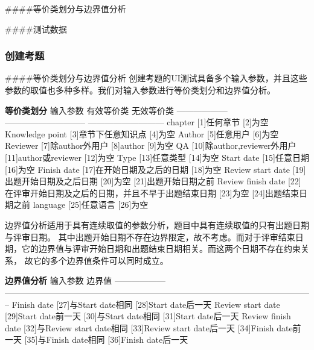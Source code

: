 \documentclass[hyperref, a4paper]{ctexart}
\begin{document}
\#\#\#\#等价类划分与边界值分析

\#\#\#\#测试数据

\hypertarget{ux521bux5efaux8003ux9898-1}{%
\subsubsection{创建考题}\label{ux521bux5efaux8003ux9898-1}}

\#\#\#\#等价类划分与边界值分析
创建考题的UI测试具备多个输入参数，并且这些参数的取值也多种多样。我们对输入参数进行等价类划分和边界值分析。

\textbf{等价类划分} \textbar{} 输入参数 \textbar{} 有效等价类 \textbar{}
无效等价类 \textbar{} \textbar{} ------------------ \textbar{}
----------------------------- \textbar{} ---------------------------
\textbar{} \textbar{} chapter \textbar{} {[}1{]}任何章节 \textbar{}
{[}2{]}为空 \textbar{} \textbar{} Knowledge point \textbar{}
{[}3{]}章节下任意知识点 \textbar{} {[}4{]}为空 \textbar{} \textbar{}
Author \textbar{} {[}5{]}任意用户 \textbar{} {[}6{]}为空 \textbar{}
\textbar{} Reviewer \textbar{} {[}7{]}除author外用户 \textbar{}
{[}8{]}author {[}9{]}为空 \textbar{} \textbar{} QA \textbar{}
{[}10{]}除author,reviewer外用户 \textbar{} {[}11{]}author或reviewer
{[}12{]}为空 \textbar{} \textbar{} Type \textbar{} {[}13{]}任意类型
\textbar{} {[}14{]}为空 \textbar{} \textbar{} Start date \textbar{}
{[}15{]}任意日期 \textbar{} {[}16{]}为空 \textbar{} \textbar{} Finish
date \textbar{} {[}17{]}在开始日期及之后的日期 \textbar{} {[}18{]}为空
\textbar{} \textbar{} Review start date \textbar{}
{[}19{]}出题开始日期及之后日期 \textbar{} {[}20{]}为空
{[}21{]}出题开始日期之前 \textbar{} \textbar{} Review finish date
\textbar{} {[}22{]}在评审开始日期及之后的日期，并且不早于出题结束日期
\textbar{} {[}23{]}为空 {[}24{]}出题结束日期之前 \textbar{} \textbar{}
language \textbar{} {[}25{]}任意语言 \textbar{} {[}26{]}为空 \textbar{}

边界值分析适用于具有连续取值的参数分析，题目中具有连续取值的只有出题日期与评审日期。
其中出题开始日期不存在边界限定，故不考虑。而对于评审结束日期，它的边界值与评审开始日期和出题结束日期相关。而这两个日期不存在约束关系，
故它的多个边界值条件可以同时成立。

\textbf{边界值分析} \textbar{} 输入参数 \textbar{} 边界值 \textbar{}
\textbar{} ------------------ \textbar{}
--------------------------------------------------------------------------------------------------------------
\textbar{} \textbar{} Finish date \textbar{} {[}27{]}与Start date相同
{[}28{]}Start date后一天 \textbar{} \textbar{} Review start date
\textbar{} {[}29{]}Start date前一天 {[}30{]}与Start date相同
{[}31{]}Start date后一天 \textbar{} \textbar{} Review finish date
\textbar{} {[}32{]}与Review start date相同 {[}33{]}Review start
date后一天 {[}34{]}Finish date前一天 {[}35{]}与Finish date相同
{[}36{]}Finish date后一天 \textbar{}
\end{document}
